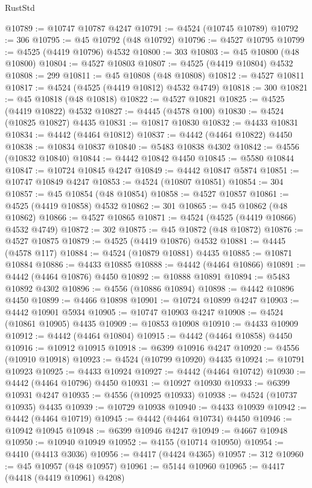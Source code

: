 \begin{lexlean}{RustStd}
\begin{coremodule}
@10789 := @10747 @10787 @4247
@10791 := @4524 (@10745 @10789)
@10792 := 306
@10795 := @45 @10792 (@48 @10792)
@10796 := @4527 @10795
@10799 := @4525 (@4419 @10796) @4532
@10800 := 303
@10803 := @45 @10800 (@48 @10800)
@10804 := @4527 @10803
@10807 := @4525 (@4419 @10804) @4532
@10808 := 299
@10811 := @45 @10808 (@48 @10808)
@10812 := @4527 @10811
@10817 := @4524 (@4525 (@4419 @10812) @4532 @4749)
@10818 := 300
@10821 := @45 @10818 (@48 @10818)
@10822 := @4527 @10821
@10825 := @4525 (@4419 @10822) @4532
@10827 := @4445 (@4578 @100)
@10830 := @4524 (@10825 @10827) @4435
@10831 := @10817 @10830
@10832 := @4433 @10831
@10834 := @4442 (@4464 @10812)
@10837 := @4442 (@4464 @10822) @4450
@10838 := @10834 @10837
@10840 := @5483 @10838 @4302
@10842 := @4556 (@10832 @10840)
@10844 := @4442 @10842 @4450
@10845 := @5580 @10844
@10847 := @10724 @10845 @4247
@10849 := @4442 @10847 @5874
@10851 := @10747 @10849 @4247
@10853 := @4524 (@10807 @10851)
@10854 := 304
@10857 := @45 @10854 (@48 @10854)
@10858 := @4527 @10857
@10861 := @4525 (@4419 @10858) @4532
@10862 := 301
@10865 := @45 @10862 (@48 @10862)
@10866 := @4527 @10865
@10871 := @4524 (@4525 (@4419 @10866) @4532 @4749)
@10872 := 302
@10875 := @45 @10872 (@48 @10872)
@10876 := @4527 @10875
@10879 := @4525 (@4419 @10876) @4532
@10881 := @4445 (@4578 @117)
@10884 := @4524 (@10879 @10881) @4435
@10885 := @10871 @10884
@10886 := @4433 @10885
@10888 := @4442 (@4464 @10866)
@10891 := @4442 (@4464 @10876) @4450
@10892 := @10888 @10891
@10894 := @5483 @10892 @4302
@10896 := @4556 (@10886 @10894)
@10898 := @4442 @10896 @4450
@10899 := @4466 @10898
@10901 := @10724 @10899 @4247
@10903 := @4442 @10901 @5934
@10905 := @10747 @10903 @4247
@10908 := @4524 (@10861 @10905) @4435
@10909 := @10853 @10908
@10910 := @4433 @10909
@10912 := @4442 (@4464 @10804)
@10915 := @4442 (@4464 @10858) @4450
@10916 := @10912 @10915
@10918 := @6399 @10916 @4247
@10920 := @4556 (@10910 @10918)
@10923 := @4524 (@10799 @10920) @4435
@10924 := @10791 @10923
@10925 := @4433 @10924
@10927 := @4442 (@4464 @10742)
@10930 := @4442 (@4464 @10796) @4450
@10931 := @10927 @10930
@10933 := @6399 @10931 @4247
@10935 := @4556 (@10925 @10933)
@10938 := @4524 (@10737 @10935) @4435
@10939 := @10729 @10938
@10940 := @4433 @10939
@10942 := @4442 (@4464 @10719)
@10945 := @4442 (@4464 @10734) @4450
@10946 := @10942 @10945
@10948 := @6399 @10946 @4247
@10949 := @4667 @10948
@10950 := @10940 @10949
@10952 := @4155 (@10714 @10950)
@10954 := @4410 (@4413 @3036)
@10956 := @4417 (@4424 @4365)
@10957 := 312
@10960 := @45 @10957 (@48 @10957)
@10961 := @5144 @10960
@10965 := @4417 (@4418 (@4419 @10961) @4208)

\end{coremodule}
\end{lexlean}
